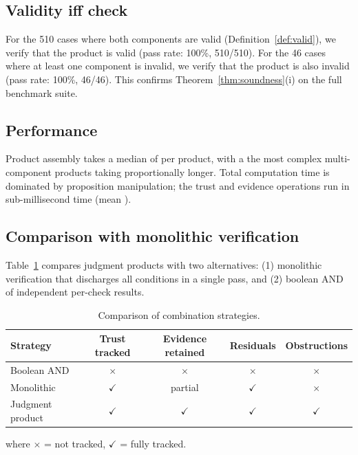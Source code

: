 \documentclass[11pt]{article}
\newcommand{\xmark}{\ensuremath{\times}}          %
\newcommand{\cmark}{\ensuremath{\checkmark}}      %
\begin{document}
\subsection{Validity iff check}

For the 510 cases where both components are valid
(Definition~\ref{def:valid}), we verify that the product is valid
(pass rate: 100\%, 510/510).  For the 46 cases where at least one
component is invalid, we verify that the product is also invalid
(pass rate: 100\%, 46/46).  This confirms Theorem~\ref{thm:soundness}(i)
on the full benchmark suite.

\subsection{Performance}

Product assembly takes a median of \ppFortyFourMedianProductTime{} per product, with a
the most complex multi-component products taking proportionally longer.
Total computation time is dominated by proposition manipulation;
the trust and evidence operations run in sub-millisecond time
(mean \ppFortyFourMeanProductTime{}).

\subsection{Comparison with monolithic verification}

Table~\ref{tab:comparison} compares judgment products with two
alternatives: (1) monolithic verification that discharges all
conditions in a single pass, and (2) boolean AND of independent
per-check results.

\begin{table}[h]
\centering
\caption{Comparison of combination strategies.}
\label{tab:comparison}
\begin{tabular}{lcccc}
\toprule
\textbf{Strategy} & \textbf{Trust tracked} & \textbf{Evidence retained}
  & \textbf{Residuals} & \textbf{Obstructions} \\
\midrule
Boolean AND      & \xmark & \xmark & \xmark & \xmark \\
Monolithic       & \cmark & partial & \cmark & \xmark \\
Judgment product & \cmark & \cmark  & \cmark & \cmark \\
\bottomrule
\end{tabular}
\end{table}

where \xmark{} = not tracked, \cmark{} = fully tracked.
\end{document}
